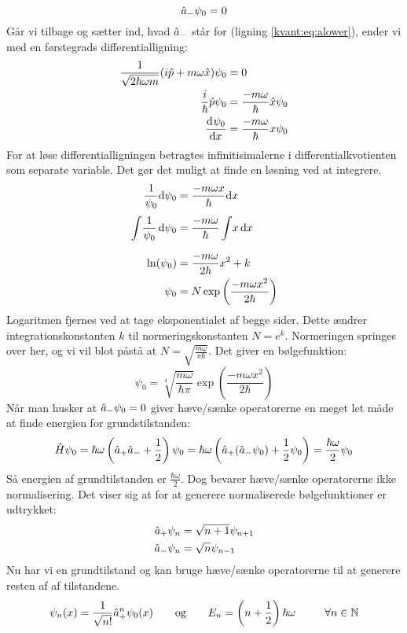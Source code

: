 \documentclass[../Kvantemekanik.tex]{subfiles}
\begin{document}
$$
\op a_-\psi_0  = 0
$$
Går vi tilbage og sætter ind, hvad $\op a_-$ står for (ligning \eqref{kvant:eq:alower}), ender vi med en førstegrads differentialligning:
\begin{align*}
\frac{1}{\sqrt{2\hbar\omega m}}(i\op p+m\omega \op x)\psi_0&=0\\
\frac{i}{\hbar}\op p\psi_0 &= \frac{-m\omega}{\hbar}\op x\psi_0\\
\dif{x}{\psi_0}&=\frac{-m\omega}{\hbar}x\psi_0
\end{align*}
For at løse differentialligningen betragtes infinitisimalerne i differentialkvotienten som separate variable. Det gør det muligt at finde en løsning ved at integrere.
\begin{align*}
\frac{1}{\psi_0}\d \psi_0 &=\frac{-m\omega x}{\hbar}\d x\\
\integral{\frac{1}{\psi_0}}{\psi_0}{}{} &= \frac{-m\omega}{\hbar}\integral{x}{x}{}{}\\
\ln(\psi_0) &= \frac{-m\omega}{2\hbar}x^2+k\\
\psi_0 &= N\exp\left({\frac{-m\omega x^2}{2\hbar}}\right)
\end{align*}
Logaritmen fjernes ved at tage eksponentialet af begge sider. Dette ændrer integrationskonstanten $k$ til normeringskonstanten $N=e^k$. Normeringen springes over her, og vi vil blot påstå at $N=\sqrt{\frac{m\omega}{\pi\hbar}}$. Det giver en bølgefunktion:
\begin{equation}
\psi_0 = \sqrt[4]{\frac{m\omega}{\hbar\pi}}\exp\left(\frac{-m\omega x^2}{2\hbar}\right)
\end{equation}
Når man husker at $\op a_-\psi_0 =0$ giver hæve/sænke operatorerne en meget let måde at finde energien for grundstilstanden:
$$
\op H \psi_0 = \hbar\omega\left(\op a_+\op a_- +\frac{1}{2}\right)\psi_0 = \hbar\omega\left(\op a_+(\op a_- \psi_0)+\frac{1}{2}\psi_0\right) = \frac{\hbar\omega}{2}\psi_0
$$
Så energien af grundtilstanden er $\frac{\hbar\omega}{2}$.
Dog bevarer hæve/sænke operatorerne ikke normalisering. Det viser sig at for at generere normaliserede bølgefunktioner er udtrykket:
\begin{align}
\op a_+\psi_n &= \sqrt{n+1}\psi_{n+1}\\
\op a_- \psi_n &= \sqrt{n}\psi_{n-1}
\end{align}
 Nu har vi en grundtilstand og kan bruge hæve/sænke operatorerne til at generere resten af af tilstandene.
\begin{equation}
\psi_n(x) = \frac{1}{\sqrt{n!}}\op a_+^n\psi_0(x) \qquad \text{og} \qquad E_n = \left(n+\frac{1}{2}\right)\hbar\omega~~~~~~~~\forall n\in\N
\end{equation}
\end{document}
